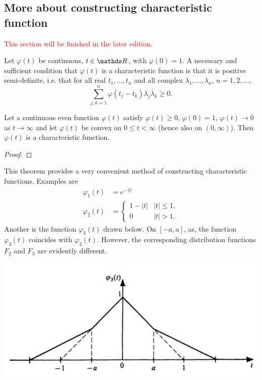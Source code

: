 \subsection{More about constructing characteristic function}
\textcolor{red}{This section will be finished in the later edition.}
\begin{theorem}
Let $\varphi(t)$ be continuous, $t\in \R$, with $\varphi(0) = 1$. A necessary and sufficient condition that $\varphi(t)$ is a characteristic function is that it is positive semi-definite, i.e. that for all real $t_1, \dots, t_n$ and all complex $\lambda_1, \dots, \lambda_n$, $n=1,2,\dots$,
\begin{equation*}
    \sum_{j,k = 1}^n \varphi(t_j - t_k)\lambda_j \overline{\lambda}_k \ge 0.
\end{equation*}
\end{theorem}
\begin{theorem}
Let a continuous even function $\varphi(t)$ satisfy $\varphi(t) \ge 0$, $\varphi(0) = 1$, $\varphi(t) \to 0$ as $t \to \infty$ and let $\varphi(t)$ be convex on $0 \le t < \infty$ (hence also on $(0, \infty)$). Then $\varphi(t)$ is a characteristic function.
\end{theorem}
\begin{unexaminable}
\begin{proof}
\end{proof}
\end{unexaminable}
This theorem provides a very convenient method of constructing characteristic functions. Examples are
\begin{align*}
    \varphi_1(t) &= e^{-|t|}\\
    \varphi_2(t) &= \begin{cases}
    1 - |t| & |t| \le 1,\\
    0 & |t| > 1.
    \end{cases}
\end{align*}
Another is the function $\varphi_3(t)$ drawn below. On $[-a, a]$, as, the function $\varphi_3(t)$ coincides with $\varphi_2(t)$. However, the corresponding distribution functions $F_2$ and $F_3$ are evidently different.

\begin{center}
\includegraphics[scale=0.7]{figures/charact_functions.png}
\end{center}

